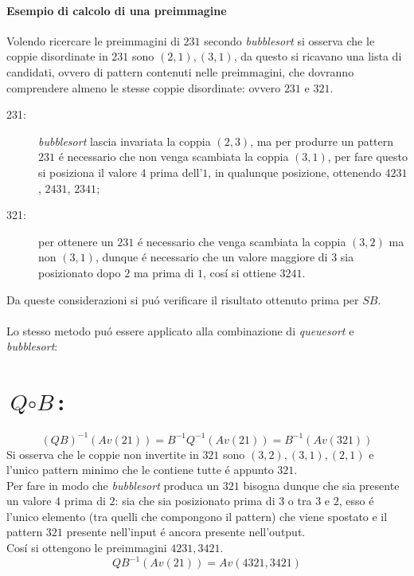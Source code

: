 \paragraph*{Esempio di calcolo di una preimmagine}Volendo ricercare le preimmagini di $231$ secondo \textit{bubblesort} si osserva che le coppie disordinate in $231$ sono $(2,1),(3,1)$, da questo si ricavano una lista di candidati, ovvero di pattern contenuti nelle preimmagini, che dovranno comprendere almeno le stesse coppie disordinate: ovvero $231$ e $321$.
\begin{description}
\item[231:] \textit{bubblesort} lascia invariata la coppia $(2,3)$, ma per produrre un pattern $231$ \'e necessario che non venga scambiata la coppia $(3,1)$, per fare questo si posiziona il valore $4$ prima dell'$1$, in qualunque posizione, ottenendo $4231$, $2431$, $2341$;
\item[321:] per ottenere un $231$ \'e necessario che venga scambiata la coppia $(3,2)$ ma non $(3,1)$, dunque \'e necessario che un valore maggiore di $3$ sia posizionato dopo $2$ ma prima di $1$, cos\'i si ottiene $3241$.
\end{description}
Da queste considerazioni si pu\'o verificare il risultato ottenuto prima per $SB$.\\\\
Lo stesso metodo pu\'o essere applicato alla combinazione di \textit{queuesort} e \textit{bubblesort}:
\section*{$\textit{Q}\circ\textit{B}$:}$$(QB)^{-1}(Av(21))=B^{-1}Q^{-1}(Av(21))=B^{-1}(Av(321))$$Si osserva che le coppie non invertite in $321$ sono $(3,2),(3,1),(2,1)$ e l'unico pattern minimo che le contiene tutte \'e appunto $321$.\\Per fare in modo che \textit{bubblesort} produca un $321$ bisogna dunque che sia presente un valore $4$ prima di $2$: sia che sia posizionato prima di $3$ o tra $3$ e $2$, esso \'e l'unico elemento (tra quelli che compongono il pattern) che viene spostato e il pattern $321$ presente nell'input \'e ancora presente nell'output.\\Cos\'i si ottengono le preimmagini $4231,3421$.$$QB^{-1}(Av(21))=Av(4321,3421)$$
